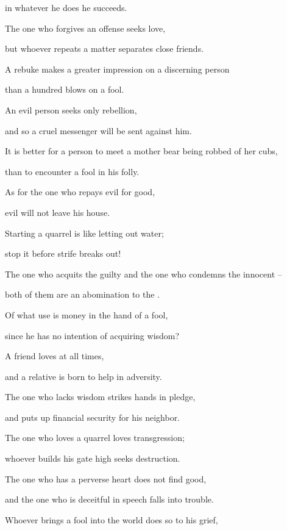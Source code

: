 {\par }{\Q in whatever
he does
he succeeds.
\par }{\Q {}The one
who forgives
an offense
seeks
love,
\par }{\Q but whoever repeats
a matter
separates
close friends.
\par }{\Q {}A rebuke makes
a greater impression
on a discerning
person
\par }{\Q than a hundred
blows
on a fool.
\par }{\Q {}An evil
person seeks
only
rebellion,
\par }{\Q and so a cruel
messenger
will be sent against him.
\par }{\Q {}It is better for a person to meet
a mother bear
being robbed of her cubs,
\par }{\Q than to encounter
a fool
in his folly.
\par }{\Q {}As
for the one who repays
evil
for
good,
\par }{\Q evil
will not
leave
his house.
\par }{\Q {}Starting
a quarrel
is like letting out
water;
\par }{\Q stop
it before
strife
breaks out!
\par }{\Q {}The one
who acquits
the guilty
and the one who condemns
the innocent –
\par }{\Q both
of them are an abomination
to the
{}.
\par }{\Q {}Of what
use is money
in the hand
of a fool,
\par }{\Q since
he has no
intention
of acquiring
wisdom?
\par }{\Q {}A friend
loves
at all
times,
\par }{\Q and a relative
is born
to help in adversity.
\par }{\Q {}The one
who lacks
wisdom
strikes
hands
in pledge,
\par }{\Q and puts up financial security for his neighbor.
\par }{\Q {}The one who loves
a quarrel
loves
transgression;
\par }{\Q whoever builds
his gate
high seeks
destruction.
\par }{\Q {}The one who has a perverse
heart
does not
find
good,
\par }{\Q and the one who is deceitful
in speech
falls
into trouble.
\par }{\Q {}Whoever brings
a fool
into the world does so to his grief,
}
